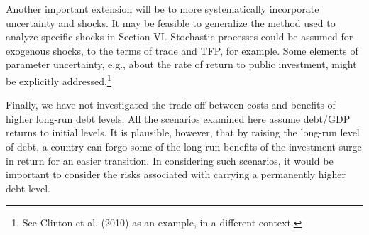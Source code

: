 \documentclass[11pt]{article}
\begin{document}
Another important extension will be to more systematically incorporate
uncertainty and shocks. It may be feasible to generalize the method used to
analyze specific shocks in Section VI. Stochastic processes could be assumed
for exogenous shocks, to the terms of trade and TFP, for example. Some
elements of parameter uncertainty, e.g., about the rate of return to public
investment, might be explicitly addressed.\footnote{%
See Clinton et al. (2010) as an example, in a different context.}

Finally, we have not investigated the trade off between costs and benefits
of higher long-run debt levels. All the scenarios examined here assume
debt/GDP returns to initial levels. It is plausible, however, that by
raising the long-run level of debt, a country can forgo some of the long-run
benefits of the investment surge in return for an easier transition. In
considering such scenarios, it would be important to consider the risks
associated with carrying a permanently higher debt level.
\end{document}
